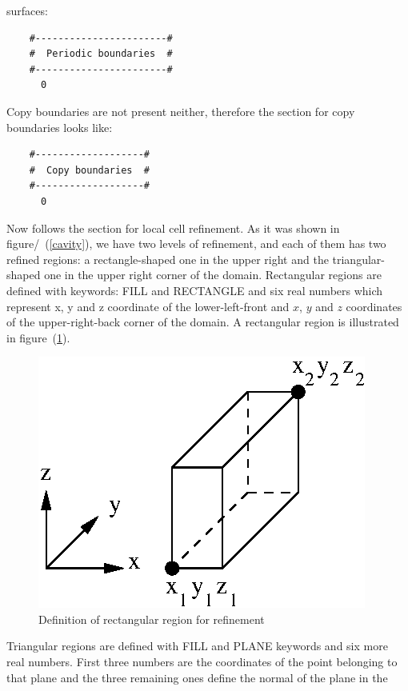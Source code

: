 \documentclass[10pt]{article}
\newcommand*{\tc}{\ttfamily} %
\begin{document}
    surfaces:
    \small
    \begin{verbatim}
    #-----------------------#
    #  Periodic boundaries  #
    #-----------------------#
      0                                
    \end{verbatim}
    \normalsize
    Copy boundaries are not present neither, therefore the section for copy
    boundaries looks like:
    \small
    \begin{verbatim}
    #-------------------#
    #  Copy boundaries  #
    #-------------------#
      0                                
    \end{verbatim}
    \normalsize
    Now follows the section for local cell refinement. As it
    was shown in figure/~(\ref{cavity}), we have two levels 
    of refinement, and each of them has two refined regions:
    a rectangle-shaped one in the upper right
    and the triangular-shaped one in the upper right corner of the
    domain. Rectangular regions are defined with keywords: {\tc FILL}
    and {\tc RECTANGLE} and six real numbers which represent x, y 
    and z coordinate of the lower-left-front and $x$, $y$ and $z$
    coordinates of the upper-right-back corner of the domain. A
    rectangular region is illustrated in figure~(\ref{rectangle}).   
    \begin{figure}
    \centering
    \includegraphics[scale=0.8]{rectangle.eps}
    \caption{Definition of rectangular region for refinement}
    \label{rectangle}
    \end{figure}
    Triangular regions are defined with {\tc FILL} and {\tc PLANE}
    keywords and six more real numbers. First three numbers are
    the coordinates of the point belonging to that plane and the
    three remaining ones define the normal of the plane in the
\end{document}
